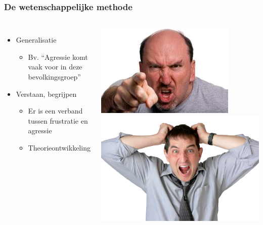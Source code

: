 \documentclass[aspectratio=169]{beamer}
\begin{document}
\begin{frame}
  \frametitle{De wetenschappelijke methode}

  \begin{columns}[c]

    \begin{itemize}
      \item Generalisatie
        \begin{itemize}
          \item Bv. ``Agressie komt vaak voor in deze bevolkingsgroep''
        \end{itemize}
      \item Verstaan, begrijpen
        \begin{itemize}
          \item Er is een verband tussen frustratie en agressie
          \item Theorieontwikkeling
        \end{itemize}
    \end{itemize}

    \includegraphics[width=\textwidth]{img/les1-05}
    \vspace*{1cm}
    \includegraphics[width=\textwidth]{img/les1-06}

  \end{columns}
\end{frame}
\end{document}

